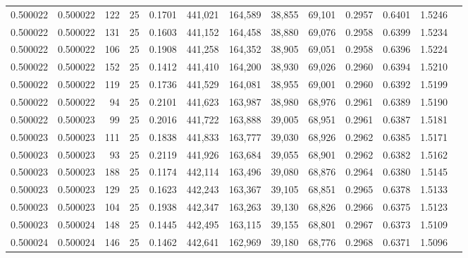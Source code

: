 \begin{tabular}{rrrrrrrrrrrrr}
0.500022 & 0.500022 &   122 &  25 &                                     0.1701 & 441,021 & 164,589 &  38,855 &  69,101 & 0.2957 & 0.6401 & 1.5246 \\
0.500022 & 0.500022 &   131 &  25 &                                     0.1603 & 441,152 & 164,458 &  38,880 &  69,076 & 0.2958 & 0.6399 & 1.5234 \\
0.500022 & 0.500022 &   106 &  25 &                                     0.1908 & 441,258 & 164,352 &  38,905 &  69,051 & 0.2958 & 0.6396 & 1.5224 \\
0.500022 & 0.500022 &   152 &  25 &                                     0.1412 & 441,410 & 164,200 &  38,930 &  69,026 & 0.2960 & 0.6394 & 1.5210 \\
0.500022 & 0.500022 &   119 &  25 &                                     0.1736 & 441,529 & 164,081 &  38,955 &  69,001 & 0.2960 & 0.6392 & 1.5199 \\
0.500022 & 0.500022 &    94 &  25 &                                     0.2101 & 441,623 & 163,987 &  38,980 &  68,976 & 0.2961 & 0.6389 & 1.5190 \\
0.500022 & 0.500023 &    99 &  25 &                                     0.2016 & 441,722 & 163,888 &  39,005 &  68,951 & 0.2961 & 0.6387 & 1.5181 \\
0.500023 & 0.500023 &   111 &  25 &                                     0.1838 & 441,833 & 163,777 &  39,030 &  68,926 & 0.2962 & 0.6385 & 1.5171 \\
0.500023 & 0.500023 &    93 &  25 &                                     0.2119 & 441,926 & 163,684 &  39,055 &  68,901 & 0.2962 & 0.6382 & 1.5162 \\
0.500023 & 0.500023 &   188 &  25 &                                     0.1174 & 442,114 & 163,496 &  39,080 &  68,876 & 0.2964 & 0.6380 & 1.5145 \\
0.500023 & 0.500023 &   129 &  25 &                                     0.1623 & 442,243 & 163,367 &  39,105 &  68,851 & 0.2965 & 0.6378 & 1.5133 \\
0.500023 & 0.500023 &   104 &  25 &                                     0.1938 & 442,347 & 163,263 &  39,130 &  68,826 & 0.2966 & 0.6375 & 1.5123 \\
0.500023 & 0.500024 &   148 &  25 &                                     0.1445 & 442,495 & 163,115 &  39,155 &  68,801 & 0.2967 & 0.6373 & 1.5109 \\
0.500024 & 0.500024 &   146 &  25 &                                     0.1462 & 442,641 & 162,969 &  39,180 &  68,776 & 0.2968 & 0.6371 & 1.5096 \\

\end{tabular}
